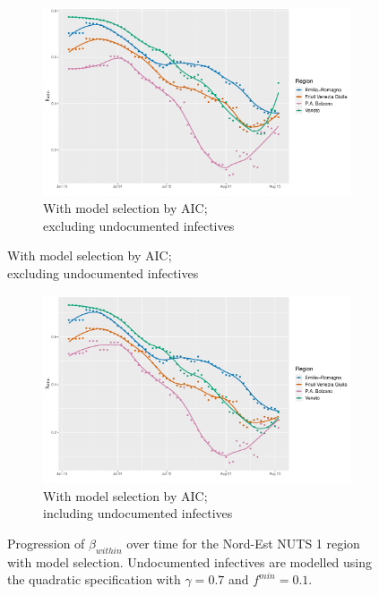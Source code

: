 \documentclass[12pt]{article}
\begin{document}
\begin{appendices}
		\begin{figure}[H]
	    \centering
    	    \begin{subfigure}{\textwidth}
    	      \centering
    	      \includegraphics[width=0.94\linewidth]{output/model_within_lag14_betawithin_Nord-Est_aic_rolling.pdf}
    	      \caption{With model selection by AIC; \\ excluding undocumented infectives}
    	      \label{fig:beta_within_over_time_nordest_aic}
    	    \end{subfigure}
        \end{figure}
        \begin{figure}[H]\ContinuedFloat
    	    \begin{subfigure}{\textwidth}
    	      \centering
    	      \includegraphics[width=0.94\linewidth]{output/model_within_lag14_betawithin_Nord-Est_aic_UndocQuadratic_rolling.pdf}
    	      \caption{With model selection by AIC; \\ including undocumented infectives}
    	      \label{fig:beta_within_over_time_nordest_aic_undoc}
    	    \end{subfigure}
    	    \caption{Progression of $\beta_{within}$ over time for the Nord-Est NUTS 1 region with model selection. Undocumented infectives are modelled using the quadratic specification with $\gamma = 0.7$ and $f^{min}=0.1$.}
    	    \label{fig:beta_within_over_time_nordest_only_aic}
        \end{figure}
		

\end{appendices}
\end{document}
